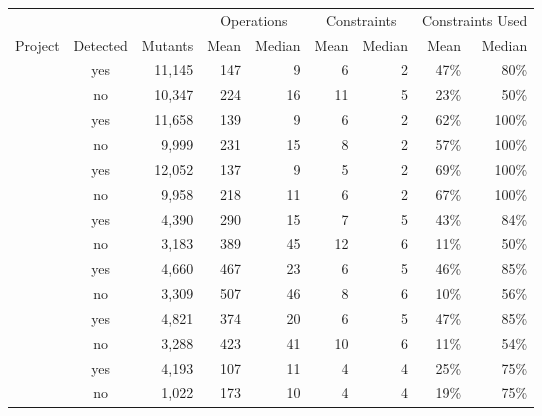   \begin{tabular*}{\linewidth}{@{\hspace{\tabcolsep}\extracolsep{\fill}}lcrrrrrrr}
  \toprule
   &  &  & \multicolumn{2}{c}{Operations} & \multicolumn{2}{c}{Constraints} & \multicolumn{2}{c}{Constraints Used} \\
  \cmidrule(lr){4-5} \cmidrule(lr){6-7} \cmidrule(lr){8-9}
  Project & Detected & Mutants & Mean & Median & Mean & Median & Mean & Median \\
  \midrule
  \DatasetEqBenchA{} & yes & 11,145 & 147 & 9 & 6 & 2 & 47\% & 80\% \\
  \DatasetEqBenchA{} & no & 10,347 & 224 & 16 & 11 & 5 & 23\% & 50\% \\
  \DatasetEqBenchB{} & yes & 11,658 & 139 & 9 & 6 & 2 & 62\% & 100\% \\
  \DatasetEqBenchB{} & no & 9,999 & 231 & 15 & 8 & 2 & 57\% & 100\% \\
  \DatasetEqBenchC{} & yes & 12,052 & 137 & 9 & 5 & 2 & 69\% & 100\% \\
  \DatasetEqBenchC{} & no & 9,958 & 218 & 11 & 6 & 2 & 67\% & 100\% \\
  \midrule
  \DatasetCommonsA{} & yes & 4,390 & 290 & 15 & 7 & 5 & 43\% & 84\% \\
  \DatasetCommonsA{} & no & 3,183 & 389 & 45 & 12 & 6 & 11\% & 50\% \\
  \DatasetCommonsB{} & yes & 4,660 & 467 & 23 & 6 & 5 & 46\% & 85\% \\
  \DatasetCommonsB{} & no & 3,309 & 507 & 46 & 8 & 6 & 10\% & 56\% \\
  \DatasetCommonsC{} & yes & 4,821 & 374 & 20 & 6 & 5 & 47\% & 85\% \\
  \DatasetCommonsC{} & no & 3,288 & 423 & 41 & 10 & 6 & 11\% & 54\% \\
  \midrule
  \DatasetCommonsDev{} & yes & 4,193 & 107 & 11 & 4 & 4 & 25\% & 75\% \\
  \DatasetCommonsDev{} & no & 1,022 & 173 & 10 & 4 & 4 & 19\% & 75\% \\
  \bottomrule
  \end{tabular*}
